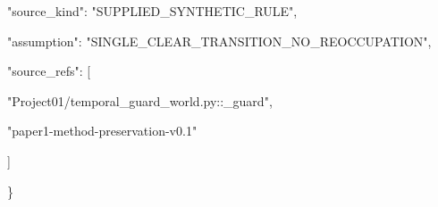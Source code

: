 \documentclass[10pt,a4paper,twocolumn]{article}\usepackage[margin=18mm]{geometry}\usepackage{fontspec,kotex}
\begin{document}
{\begin{minipage}{\dimexpr\linewidth-2\fboxsep-2\fboxrule\relax}
\noindent{}\hspace{.4em}\parbox[t]{\dimexpr\linewidth-2em\relax}{\raggedright\ttfamily{}\fontsize{7.2}{9}\selectfont \hspace*{0.6em}"source\_\allowbreak kind": "SUPPLIED\_\allowbreak SYNTHETIC\_\allowbreak RULE",\allowbreak \strut}\par
\noindent{}\hspace{.4em}\parbox[t]{\dimexpr\linewidth-2em\relax}{\raggedright\ttfamily{}\fontsize{7.2}{9}\selectfont \hspace*{0.6em}"assumption": "SINGLE\_\allowbreak CLEAR\_\allowbreak TRANSITION\_\allowbreak NO\_\allowbreak REOCCUPATION",\allowbreak \strut}\par
\noindent{}\hspace{.4em}\parbox[t]{\dimexpr\linewidth-2em\relax}{\raggedright\ttfamily{}\fontsize{7.2}{9}\selectfont \hspace*{0.6em}"source\_\allowbreak refs": [\strut}\par
\noindent{}\hspace{.4em}\parbox[t]{\dimexpr\linewidth-2em\relax}{\raggedright\ttfamily{}\fontsize{7.2}{9}\selectfont \hspace*{1.2em}"Project01/temporal\_\allowbreak guard\_\allowbreak world.py::\_\allowbreak guard",\allowbreak \strut}\par
\noindent{}\hspace{.4em}\parbox[t]{\dimexpr\linewidth-2em\relax}{\raggedright\ttfamily{}\fontsize{7.2}{9}\selectfont \hspace*{1.2em}"paper1-method-preservation-v0.1"\strut}\par
\noindent{}\hspace{.4em}\parbox[t]{\dimexpr\linewidth-2em\relax}{\raggedright\ttfamily{}\fontsize{7.2}{9}\selectfont \hspace*{0.6em}]\strut}\par
\noindent{}\hspace{.4em}\parbox[t]{\dimexpr\linewidth-2em\relax}{\raggedright\ttfamily{}\fontsize{7.2}{9}\selectfont \hspace*{0.0em}\}\strut}\par
\end{minipage}}\par\smallskip
\end{document}
